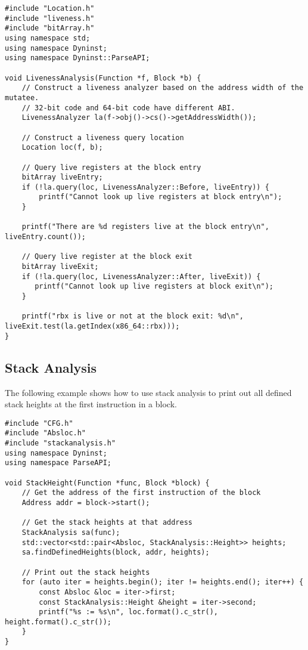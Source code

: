 \lstset{numbers=left, numberstyle=\tiny, stepnumber=5, numbersep=5pt}
\lstset{showstringspaces=false}
\begin{lstlisting}
#include "Location.h"
#include "liveness.h"
#include "bitArray.h"
using namespace std;
using namespace Dyninst;
using namespace Dyninst::ParseAPI;

void LivenessAnalysis(Function *f, Block *b) {   
    // Construct a liveness analyzer based on the address width of the mutatee.
    // 32-bit code and 64-bit code have different ABI.
    LivenessAnalyzer la(f->obj()->cs()->getAddressWidth());
   
    // Construct a liveness query location
    Location loc(f, b);
   
    // Query live registers at the block entry
    bitArray liveEntry;
    if (!la.query(loc, LivenessAnalyzer::Before, liveEntry)) {
        printf("Cannot look up live registers at block entry\n");
    }

    printf("There are %d registers live at the block entry\n", liveEntry.count());

    // Query live register at the block exit
    bitArray liveExit;
    if (!la.query(loc, LivenessAnalyzer::After, liveExit)) {
       printf("Cannot look up live registers at block exit\n");
    }

    printf("rbx is live or not at the block exit: %d\n", liveExit.test(la.getIndex(x86_64::rbx)));
}
\end{lstlisting}

\subsection{Stack Analysis}
The following example shows how to use stack analysis to print out all defined stack heights at the first instruction in a block.

\lstset{numbers=left, numberstyle=\tiny, stepnumber=5, numbersep=5pt}
\lstset{showstringspaces=false}
\begin{lstlisting}
#include "CFG.h"
#include "Absloc.h"
#include "stackanalysis.h"
using namespace Dyninst;
using namespace ParseAPI;

void StackHeight(Function *func, Block *block) {
    // Get the address of the first instruction of the block
    Address addr = block->start();

    // Get the stack heights at that address
    StackAnalysis sa(func);
    std::vector<std::pair<Absloc, StackAnalysis::Height>> heights;
    sa.findDefinedHeights(block, addr, heights);

    // Print out the stack heights
    for (auto iter = heights.begin(); iter != heights.end(); iter++) {
        const Absloc &loc = iter->first;
        const StackAnalysis::Height &height = iter->second;
        printf("%s := %s\n", loc.format().c_str(), height.format().c_str());
    }
}
\end{lstlisting}


